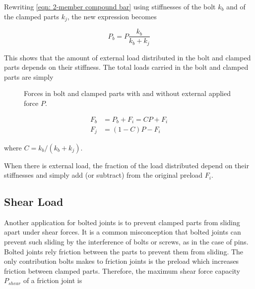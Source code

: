 \documentclass[
10pt,
a4paper,
openany,
svgnames,
]{book}
\begin{document}
Rewriting \cref{eqn: 2-member compound bar} using stiffnesses of the bolt $k_b$ and of the clamped parts $k_j$, the new expression becomes

\begin{equation}
  P_b = P\frac{k_b}{k_b + k_j}
\end{equation}

This shows that the amount of external load distributed in the bolt and clamped parts depends on their stiffness. The total loads carried in the bolt and clamped parts are simply

\begin{figure}[h]
  \centering
  \caption{Forces in bolt and clamped parts with and without external applied force $P$.}
  \label{fig: bolt-joint interaction}
\end{figure}

\begin{align} \label{eqn: bolt-joint interaction}
  F_b &= P_b + F_i = CP + F_i \\
  F_j &= (1 - C)P - F_i
\end{align}

where $C = k_b/(k_b + k_j)$.

When there is external load, the fraction of the load distributed depend on their stiffnesses and simply add (or subtract) from the original preload $F_i$.

\subsection{Shear Load}

Another application for bolted joints is to prevent clamped parts from sliding apart under shear forces. It is a common misconception that bolted joints can prevent such sliding by the interference of bolts or screws, as in the case of pins. Bolted joints rely friction between the parts to prevent them from sliding. The only contribution bolts makes to friction joints is the preload which increases friction between clamped parts. Therefore, the maximum shear force capacity $P_{shear}$ of a friction joint is
\end{document}
